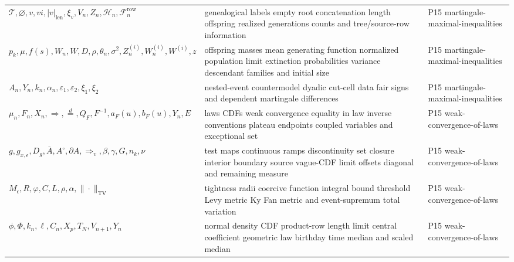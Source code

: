 \begin{longtable}{@{}p{}p{}p{}@{}}
\(\mathcal T,\allowbreak \varnothing,\allowbreak v,\allowbreak vi,\allowbreak |v|_{\mathrm{len}},\allowbreak \xi_v,\allowbreak V_n,\allowbreak Z_n,\allowbreak \mathcal H_n,\allowbreak \mathcal F_n^{\mathrm{row}}\) & genealogical labels empty root concatenation length offspring realized generations counts and tree/source-row information & P15 martingale-\allowbreak{}maximal-\allowbreak{}inequalities \\
\(p_k,\allowbreak \mu,\allowbreak f(s),\allowbreak W_n,\allowbreak W,\allowbreak D,\allowbreak \rho,\allowbreak \theta_n,\allowbreak \sigma^2,\allowbreak Z_n^{(i)},\allowbreak W_n^{(i)},\allowbreak W^{(i)},\allowbreak z\) & offspring masses mean generating function normalized population limit extinction probabilities variance descendant families and initial size & P15 martingale-\allowbreak{}maximal-\allowbreak{}inequalities \\
\(A_n,\allowbreak Y_n,\allowbreak k_n,\allowbreak \alpha_n,\allowbreak \varepsilon_1,\allowbreak \varepsilon_2,\allowbreak \xi_1,\allowbreak \xi_2\) & nested-event countermodel dyadic cut-cell data fair signs and dependent martingale differences & P15 martingale-\allowbreak{}maximal-\allowbreak{}inequalities \\
\(\mu_n,\allowbreak F_n,\allowbreak X_n,\allowbreak \Rightarrow,\allowbreak \stackrel{d}{=},\allowbreak Q_F,\allowbreak F^{-1},\allowbreak a_F(u),\allowbreak b_F(u),\allowbreak Y_n,\allowbreak E\) & laws CDFs weak convergence equality in law inverse conventions plateau endpoints coupled variables and exceptional set & P15 weak-\allowbreak{}convergence-\allowbreak{}of-\allowbreak{}laws \\
\(g,\allowbreak g_{x,\epsilon},\allowbreak D_g,\allowbreak \overline A,\allowbreak A^\circ,\allowbreak \partial A,\allowbreak \Rightarrow_v,\allowbreak \beta,\allowbreak \gamma,\allowbreak G,\allowbreak n_k,\allowbreak \nu\) & test maps continuous ramps discontinuity set closure interior boundary source vague-CDF limit offsets diagonal and remaining measure & P15 weak-\allowbreak{}convergence-\allowbreak{}of-\allowbreak{}laws \\
\(M_\epsilon,\allowbreak R,\allowbreak \varphi,\allowbreak C,\allowbreak L,\allowbreak \rho,\allowbreak \alpha,\allowbreak \|\cdot\|_{\mathrm{TV}}\) & tightness radii coercive function integral bound threshold Levy metric Ky Fan metric and event-supremum total variation & P15 weak-\allowbreak{}convergence-\allowbreak{}of-\allowbreak{}laws \\
\(\phi,\allowbreak \Phi,\allowbreak k_n,\allowbreak \ell,\allowbreak C_n,\allowbreak X_p,\allowbreak T_N,\allowbreak V_{n+1},\allowbreak Y_n\) & normal density CDF product-row length limit central coefficient geometric law birthday time median and scaled median & P15 weak-\allowbreak{}convergence-\allowbreak{}of-\allowbreak{}laws \\

\end{longtable}
